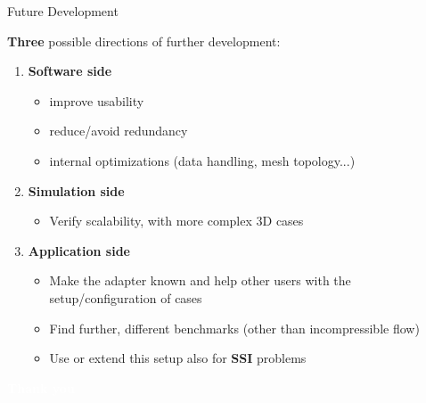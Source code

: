 \documentclass[10pt,t]{beamer}
\begin{document}
\begin{frame}{Future Development}

\textbf{Three} possible directions of further development:

\vspace{0.3cm}


\begin{enumerate}
    \item \textcolor{pblue}{\textbf{Software side}}
        \itemsep 10pt
        \begin{itemize}
            \item improve usability
            \item reduce/avoid redundancy
            \item internal optimizations (data handling, mesh topology...)
        \end{itemize}    

    
    \item \textcolor{pblue}{\textbf{Simulation side}}
    
        \begin{itemize}
            \item Verify scalability, with more complex 3D cases
        \end{itemize}

    
    \item \textcolor{pblue}{\textbf{Application side}}
    
        \begin{itemize}
            \item Make the adapter known and help other users with the setup/configuration of cases
            \item Find further, different benchmarks (other than incompressible flow)
            \item Use or extend this setup also for \textbf{SSI} problems 
        \end{itemize}
    
\end{enumerate}


\end{frame}


\begin{frame}[c,plain]{}
    \centering
    \large{\textcolor{white}{\textbf{Thank you}}}
\end{frame}
\end{document}
